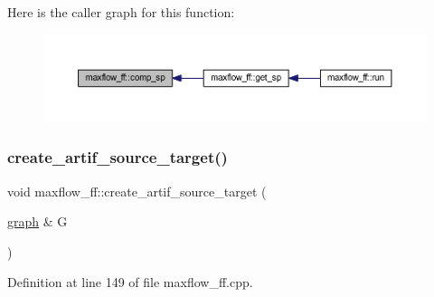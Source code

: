 Here is the caller graph for this function\+:\nopagebreak
\begin{figure}[H]
\begin{center}
\leavevmode
\includegraphics[width=350pt]{classmaxflow__ff_afefc972c43e8eb031abaac1451473f9c_icgraph}
\end{center}
\end{figure}
\mbox{\label{classmaxflow__ff_ad2634e4325012773d793e9cf8f1a3dcf}} 
\subsubsection{\texorpdfstring{create\+\_\+artif\+\_\+source\+\_\+target()}{create\_artif\_source\_target()}}
{\footnotesize\ttfamily void maxflow\+\_\+ff\+::create\+\_\+artif\+\_\+source\+\_\+target (\begin{DoxyParamCaption}\item[{\mbox{\hyperlink{classgraph}{graph}} \&}]{G }\end{DoxyParamCaption})\hspace{0.3cm}{\ttfamily [protected]}}



Definition at line 149 of file maxflow\+\_\+ff.\+cpp.


